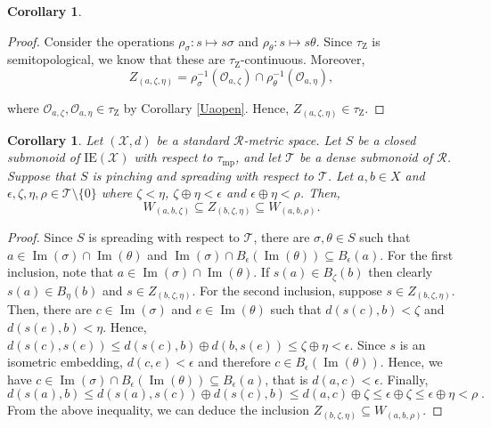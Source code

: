 \documentclass{article}
\newtheorem{corollary}[theorem]{Corollary}
\theoremstyle{remark}
\theoremstyle{definition}
\DeclareMathOperator{\im}{Im}
\newcommand{\zar}[0]{\tau_{\mathrm{Z}}}
\newcommand{\mpw}[0]{\tau_{\mathrm{mp}}}
\renewcommand\leq{\leqslant}
\newcommand{\rr}[0]{\mathcal{R}}
\newcommand{\ie}[0]{\mathrm{IE}}
\begin{document}
{{{{{\begin{corollary}
\end{corollary}
\begin{proof}
Consider the operations $\rho_\sigma: s\mapsto s\sigma$ and $\rho_{\theta}:s\mapsto s\theta$. Since $\zar$ is semitopological, we know that these are $\zar$-continuous. Moreover, 
\[Z_{(a, \zeta,\eta)}=\rho_\sigma^{-1}(\mathcal{O}_{a, \zeta})\cap \rho_{\theta}^{-1}(\mathcal{O}_{a, \eta}),\]

where $\mathcal{O}_{a, \zeta}, \mathcal{O}_{a, \eta}\in \zar$ by Corollary \ref{Uaopen}. Hence, $Z_{(a, \zeta,\eta)}\in\zar$.
\end{proof}
 
\begin{corollary}\label{containments} Let $(\mathcal{X}, d)$ be a standard $\rr$-metric space. Let $S$ be a closed submonoid of $\ie(\mathcal{X})$ with respect to $\mpw$, and let $\mathcal{T}$ be a dense submonoid of $\rr$.  Suppose that $S$ is pinching and spreading with respect to $\mathcal{T}$. {Let $a, b\in X$  and  $\epsilon, \zeta, \eta,\rho\in \mathcal T \setminus\{0\}$  where $\zeta<\eta$, $\zeta\oplus\eta<\epsilon$ and $\epsilon\oplus\eta<\rho$. Then, 
\[W_{(a, b, \zeta)}\subseteq Z_{(b, \zeta,\eta)}\subseteq W_{(a, b, \rho)}.\]}
\end{corollary}

\begin{proof} %
Since $S$ is spreading with respect to $\mathcal T$, there are $\sigma,\theta\in S$  such that $a\in\im(\sigma)\cap \im(\theta)$ and
$\im(\sigma)\cap B_\epsilon(\im(\theta))\subseteq B_{\epsilon}(a)$.
For the first inclusion, note that $a\in\im(\sigma)\cap\im(\theta)$. If $s(a)\in B_{\zeta}(b)$  then clearly $s(a)\in B_{\eta}(b)$ and $ s\in Z_{(b, \zeta,\eta)}$.
For the second inclusion, suppose $s\in Z_{(b, \zeta,\eta)}$. 
Then, there are $c\in\im(\sigma)$ and $ e\in\im(\theta)$ such that $d(s(c), b)<\zeta$ and $ d(s(e), b)<\eta$. %
{Hence,} $d(s(c), s(e))\leq d(s(c),b)\oplus d(b,s(e))\leq \zeta\oplus\eta< \epsilon$. 
Since $s$ is an isometric embedding, $d(c,e)<\epsilon$ and therefore $c\in B_\epsilon(\im(\theta))$. Hence, we have $c\in \im(\sigma)\cap B_\epsilon(\im(\theta))\subseteq B_\epsilon(a)$, that is $d(a,c)<\epsilon$. Finally, 
\[d(s(a), b)\leq d(s(a), s(c))\oplus d(s(c), b)\leq d(a, c)\oplus\zeta\leq \epsilon\oplus \zeta\leq \epsilon\oplus\eta<\rho\;.\]
From the above inequality, we can deduce the inclusion $Z_{(b,\zeta, \eta)}\subseteq W_{(a,b, \rho)}$.
    
\end{proof}

}}}}}
\end{document}
